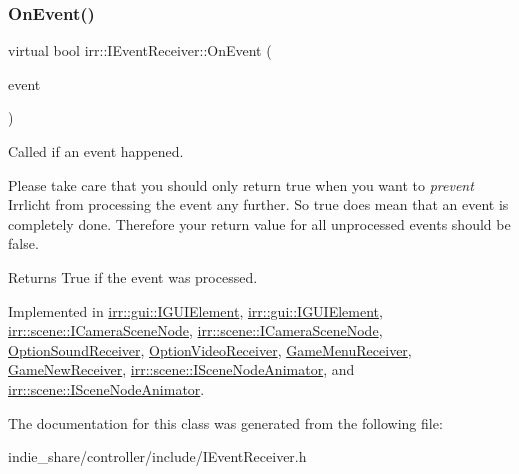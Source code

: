 \mbox{\label{classirr_1_1IEventReceiver_a571f744ceffc3b4fe8a81f529163eb97}} 
\subsubsection{\texorpdfstring{On\+Event()}{OnEvent()}\hspace{0.1cm}{\footnotesize\ttfamily [2/2]}}
{\footnotesize\ttfamily virtual bool irr\+::\+I\+Event\+Receiver\+::\+On\+Event (\begin{DoxyParamCaption}\item[{const \hyperlink{structirr_1_1SEvent}{S\+Event} \&}]{event }\end{DoxyParamCaption})\hspace{0.3cm}{\ttfamily [pure virtual]}}



Called if an event happened. 

Please take care that you should only return \textquotesingle{}true\textquotesingle{} when you want to {\itshape prevent} Irrlicht from processing the event any further. So \textquotesingle{}true\textquotesingle{} does mean that an event is completely done. Therefore your return value for all unprocessed events should be \textquotesingle{}false\textquotesingle{}. \begin{DoxyReturn}{Returns}
True if the event was processed. 
\end{DoxyReturn}


Implemented in \hyperlink{classirr_1_1gui_1_1IGUIElement_a54b1799e21722d9e6ce5b8e4bdb2e80a}{irr\+::gui\+::\+I\+G\+U\+I\+Element}, \hyperlink{classirr_1_1gui_1_1IGUIElement_a54b1799e21722d9e6ce5b8e4bdb2e80a}{irr\+::gui\+::\+I\+G\+U\+I\+Element}, \hyperlink{classirr_1_1scene_1_1ICameraSceneNode_af27145518f43a17f803cdea086f68f3c}{irr\+::scene\+::\+I\+Camera\+Scene\+Node}, \hyperlink{classirr_1_1scene_1_1ICameraSceneNode_af27145518f43a17f803cdea086f68f3c}{irr\+::scene\+::\+I\+Camera\+Scene\+Node}, \hyperlink{classOptionSoundReceiver_ae7c9643b12df38a45d4e3d629274019c}{Option\+Sound\+Receiver}, \hyperlink{classOptionVideoReceiver_a203025900c489eb2df12a6b3471c3caa}{Option\+Video\+Receiver}, \hyperlink{classGameMenuReceiver_af6774556abc7e3718b7bf904cc62ead0}{Game\+Menu\+Receiver}, \hyperlink{classGameNewReceiver_ad9ec097d8b46946ed1a21c24463fc0b6}{Game\+New\+Receiver}, \hyperlink{classirr_1_1scene_1_1ISceneNodeAnimator_aca20b841bb586cd9654464b001a7b6aa}{irr\+::scene\+::\+I\+Scene\+Node\+Animator}, and \hyperlink{classirr_1_1scene_1_1ISceneNodeAnimator_aca20b841bb586cd9654464b001a7b6aa}{irr\+::scene\+::\+I\+Scene\+Node\+Animator}.



The documentation for this class was generated from the following file\+:\begin{DoxyCompactItemize}
\item 
indie\+\_\+share/controller/include/I\+Event\+Receiver.\+h\end{DoxyCompactItemize}
